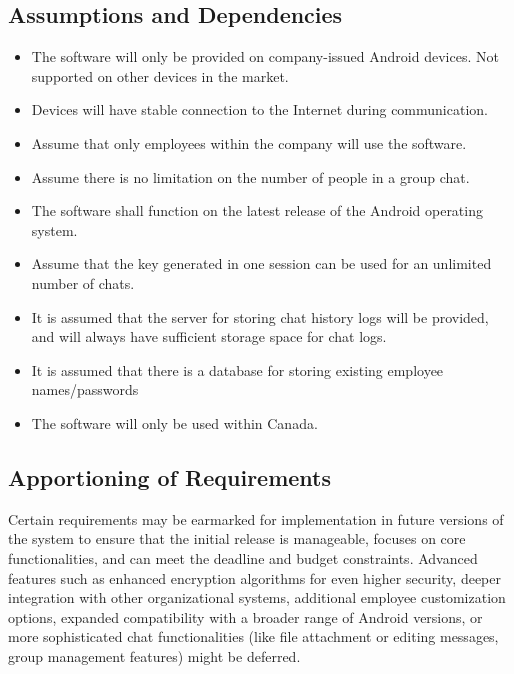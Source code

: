 \documentclass[]{article}
\begin{document}

\subsection{Assumptions and Dependencies}
\label{sub:assumptions_and_dependencies}
\begin{itemize}
	\item The software will only be provided on company-issued Android devices. Not supported on other devices in the market.
    \item Devices will have stable connection to the Internet during communication. 
    \item Assume that only employees within the company will use the software. 
    \item Assume there is no limitation on the number of people in a group chat.  
    \item The software shall function on the latest release of the Android operating system. 
    \item Assume that the key generated in one session can be used for an unlimited number of chats. 
    \item It is assumed that the server for storing chat history logs will be provided, and will always have sufficient storage space for chat logs. 
    \item It is assumed that there is a database for storing existing employee names/passwords
    \item The software will only be used within Canada.

\end{itemize}

\subsection{Apportioning of Requirements}
\label{sub:apportioning_of_requirements}
\hspace{5mm}Certain requirements may be earmarked for implementation in future versions of the system to ensure that the initial release is manageable, focuses on core functionalities, and can meet the deadline and budget constraints. Advanced features such as enhanced encryption algorithms for even higher security, deeper integration with other organizational systems, additional employee customization options, expanded compatibility with a broader range of Android versions, or more sophisticated chat functionalities (like file attachment or editing messages, group management features) might be deferred. 
\end{document}
